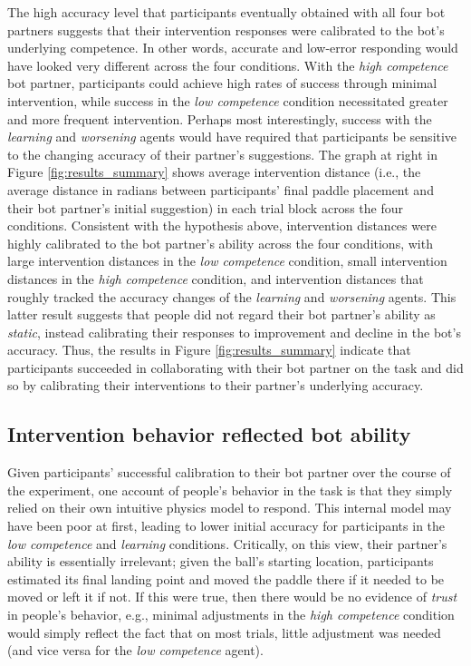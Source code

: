 \documentclass[10pt,letterpaper]{article}
\begin{document}
The high accuracy level that participants eventually obtained with all four bot partners suggests that their intervention responses were calibrated to the bot's underlying competence. In other words, accurate and low-error responding would have looked very different across the four conditions. With the \textit{high competence} bot partner, participants could achieve high rates of success through minimal intervention, while success in the \textit{low competence} condition necessitated greater and more frequent intervention. Perhaps most interestingly, success with the \textit{learning} and \textit{worsening} agents would have required that participants be sensitive to the changing accuracy of their partner's suggestions. The graph at right in Figure \ref{fig:results_summary} shows average intervention distance (i.e., the average distance in radians between participants' final paddle placement and their bot partner's initial suggestion) in each trial block across the four conditions. Consistent with the hypothesis above, intervention distances were highly calibrated to the bot partner's ability across the four conditions, with large intervention distances in the \textit{low competence} condition, small intervention distances in the \textit{high competence} condition, and intervention distances that roughly tracked the accuracy changes of the \textit{learning} and \textit{worsening} agents. This latter result suggests that people did not regard their bot partner's ability as \textit{static}, instead calibrating their responses to improvement and decline in the bot's accuracy. Thus, the results in Figure \ref{fig:results_summary} indicate that participants succeeded in collaborating with their bot partner on the task and did so by calibrating their interventions to their partner's underlying accuracy.


\subsection{Intervention behavior reflected bot ability}

Given participants' successful calibration to their bot partner over the course of the experiment, one account of people's behavior in the task is that they simply relied on their own intuitive physics model to respond. This internal model may have been poor at first, leading to lower initial accuracy for participants in the \textit{low competence} and \textit{learning} conditions. Critically, on this view, their partner's ability is essentially irrelevant; given the ball's starting location, participants estimated its final landing point and moved the paddle there if it needed to be moved or left it if not. If this were true, then there would be no evidence of \textit{trust} in people's behavior, e.g., minimal adjustments in the \textit{high competence} condition would simply reflect the fact that on most trials, little adjustment was needed (and vice versa for the \textit{low competence} agent). 
\end{document}
